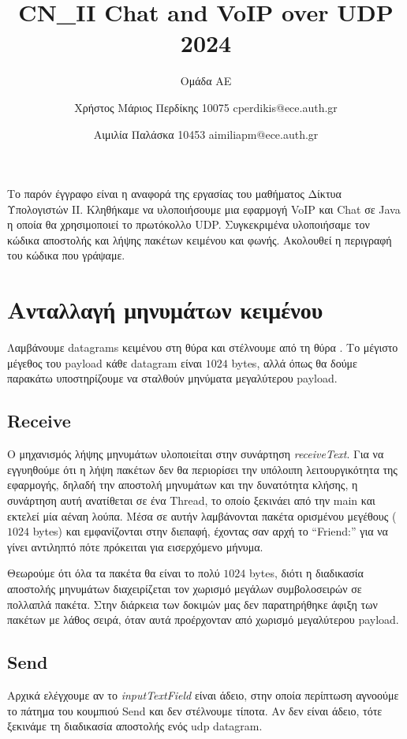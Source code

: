 \documentclass{article}
\title{CN\_II Chat and VoIP over UDP 2024}
\author{\phantom{hehehe they will never see this coming!}Ομάδα ΑΕ\phantom{hehehe they will never see this coming!} \and 
    Χρήστος Μάριος Περδίκης 10075 cperdikis@ece.auth.gr
   \and Αιμιλία Παλάσκα 10453 aimiliapm@ece.auth.gr}
\date{}
\begin{document}
\maketitle

Το παρόν έγγραφο είναι η αναφορά της εργασίας του μαθήματος Δίκτυα Υπολογιστών 
ΙΙ. Κληθήκαμε να υλοποιήσουμε μια εφαρμογή VoIP και Chat σε Java η οποία θα
χρησιμοποιεί το πρωτόκολλο UDP. Συγκεκριμένα υλοποιήσαμε τον κώδικα αποστολής 
και λήψης πακέτων κειμένου και φωνής. Ακολουθεί η περιγραφή του κώδικα που γράψαμε.

\section{Ανταλλαγή μηνυμάτων κειμένου}
Λαμβάνουμε datagrams κειμένου στη θύρα \textdestport{} και στέλνουμε από τη θύρα 
\textdestport. Το μέγιστο μέγεθος του payload κάθε datagram είναι $1024$ bytes, αλλά όπως θα 
δούμε παρακάτω υποστηρίζουμε να σταλθούν μηνύματα μεγαλύτερου payload.

\subsection{Receive}
Ο μηχανισμός λήψης μηνυμάτων υλοποιείται στην συνάρτηση \textit{receiveText}.
Για να εγγυηθούμε ότι η λήψη πακέτων δεν θα περιορίσει την υπόλοιπη λειτουργικότητα της
εφαρμογής, δηλαδή την αποστολή μηνυμάτων και την δυνατότητα κλήσης, η συνάρτηση αυτή
ανατίθεται σε ένα Thread, το οποίο ξεκινάει από την main και εκτελεί μία αέναη λούπα. 
Μέσα σε αυτήν λαμβάνονται πακέτα ορισμένου μεγέθους ($1024$ bytes) και εμφανίζονται στην
διεπαφή, έχοντας σαν αρχή το ``Friend:'' για να γίνει αντιληπτό πότε πρόκειται για εισερχόμενο
μήνυμα.

Θεωρούμε ότι όλα τα πακέτα θα είναι το πολύ $1024$ bytes, διότι η διαδικασία
αποστολής μηνυμάτων διαχειρίζεται τον χωρισμό μεγάλων συμβολοσειρών σε πολλαπλά πακέτα.
Στην διάρκεια των δοκιμών μας δεν παρατηρήθηκε άφιξη των πακέτων με λάθος σειρά, όταν αυτά
προέρχονταν από χωρισμό μεγαλύτερου payload. 

\subsection{Send}
Αρχικά ελέγχουμε αν το \textit{inputTextField} είναι άδειο, στην οποία 
περίπτωση αγνοούμε το πάτημα του κουμπιού Send και δεν στέλνουμε τίποτα. 
Αν δεν είναι άδειο, τότε ξεκινάμε τη διαδικασία αποστολής ενός udp datagram.
\end{document}
